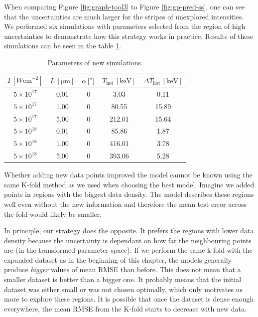 When comparing Figure \ref{fig:graph-tool3} to Figure \ref{fig:gp-pred-ss}, one can see that the uncertainties are much larger for the stripes of unexplored intensities. We performed six simulations with parameters selected from the region of high uncertainties to demonstrate how this strategy works in practice. Results of these simulations can be seen in the table \ref{tab:new-simulations}.

\begin{table}[h]
	\centering
	\caption{Parameters of new simulations.}
	\begin{tabular}{c c c c c}
		\toprule
	     $I \, \left[W \mathrm{cm}^{-2}\right]$ & $L \, \mathrm{[\mu m]}$ & $\alpha \, \mathrm{[\degree]}$  & $T_\mathrm{hot} \, [\mathrm{keV}] $ &  $\Delta T_\mathrm{hot} \, [\mathrm{keV}]$ \\ 
		\midrule
		$5\times 10^{17}$ & 0.01 &0 &3.03 &0.11  \\
		$5\times 10^{17}$ & 1.00 &0 &80.55 & 15.89 \\
		$5\times 10^{17}$ & 5.00 &0 &212.01 & 15.64 \\
		$5\times 10^{18}$ & 0.01 &0 &85.86 & 1.87 \\
		$5\times 10^{18}$ & 1.00 &0 &416.01 & 3.78 \\
		$5\times 10^{18}$ & 5.00 &0 &393.06 & 5.28 \\
		\bottomrule
	\end{tabular}
	\label{tab:new-simulations}
\end{table}

Whether adding new data points improved the model cannot be known using the same K-fold method as we used when choosing the best model. Imagine we added points in regions with the biggest data density. The model describes these regions well even without the new information and therefore the mean test error across the fold would likely be smaller. 

In principle, our strategy does the opposite. It prefers the regions with lower data density because the uncertainty is dependant on how far the neighbouring points are (in the transformed parameter space). If we perform the same k-fold with the expanded dataset as in the beginning of this chapter, the models generally produce \textit{bigger} values of mean RMSE than before. This does not mean that a smaller dataset is better than a bigger one. It probably means that the initial dataset was either small or was not chosen optimally, which only motivates us more to explore these regions. It is possible that once the dataset is dense enough everywhere, the mean RMSE from the K-fold starts to decrease with new data.


